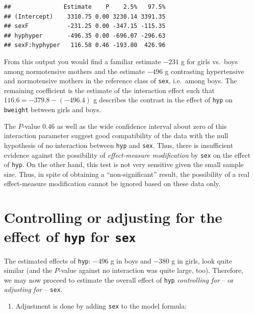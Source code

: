 \documentclass[
]{book}
\providecommand{\tightlist}{%
  \setlength{\itemsep}{0pt}\setlength{\parskip}{0pt}}
\theoremstyle{definition}
\theoremstyle{definition}
\theoremstyle{definition}
\theoremstyle{definition}
\theoremstyle{remark}
\begin{document}
\begin{verbatim}
##               Estimate    P    2.5%   97.5%
## (Intercept)    3310.75 0.00 3230.14 3391.35
## sexF           -231.25 0.00 -347.15 -115.35
## hyphyper       -496.35 0.00 -696.07 -296.63
## sexF:hyphyper   116.58 0.46 -193.80  426.96
\end{verbatim}

From this output you would find a familiar estimate \(-231\) g for girls
vs.~boys among normotensive mothers and the estimate \(-496\) g
contrasting hypertensive and normotensive mothers in the
reference class of \texttt{sex}, i.e.~among boys.
The remaining coefficient is the estimate of the interaction
effect such that \(116.6 = -379.8 -(-496.4)\) g
describes the contrast in the effect of \texttt{hyp} on \texttt{bweight}
between girls and boys.

The \(P\)-value \(0.46\) as well
as the wide confidence interval about zero of this interaction
parameter suggest good compatibility of the data with
the null hypothesis of
no interaction between \texttt{hyp} and \texttt{sex}. Thus,
there is insufficient evidence against
the possibility of \emph{effect-measure modification} by
\texttt{sex} on the effect of \texttt{hyp}.
On the other hand, this test is not very sensitive given
the small sample size. Thus, in spite of obtaining a ``non-significant''
result, the possibility of a real effect-measure modification
cannot be ignored based on these data only.

\section{\texorpdfstring{Controlling or adjusting for the effect of \texttt{hyp} for \texttt{sex}}{Controlling or adjusting for the effect of hyp for sex}}\label{controlling-or-adjusting-for-the-effect-of-hyp-for-sex}

The estimated effects of \texttt{hyp}:
\(-496\) g in boys and \(-380\) g in girls, look quite
similar (and the \(P\)-value against no interaction was quite large, too).
Therefore, we may now proceed to estimate the overall effect of \texttt{hyp}
\emph{controlling for} -- or \emph{adjusting for} -- \texttt{sex}.

\begin{enumerate}
\def\labelenumi{\arabic{enumi}.}
\tightlist
\item
  Adjustment is done by adding \texttt{sex} to the model formula:
\end{enumerate}
\end{document}
